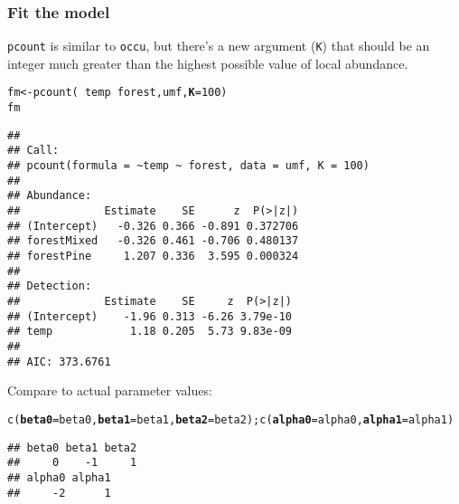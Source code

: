 \documentclass[color=usenames,dvipsnames]{beamer}\usepackage[]{graphicx}\usepackage[]{color}
\makeatletter
\newcommand{\hlnum}[1]{\textcolor[rgb]{0.69,0.494,0}{#1}}%
\newcommand{\hlopt}[1]{\textcolor[rgb]{0,0,0}{#1}}%
\newcommand{\hlstd}[1]{\textcolor[rgb]{0,0,0}{#1}}%
\newcommand{\hlkwb}[1]{\textcolor[rgb]{0,0.341,0.682}{#1}}%
\newcommand{\hlkwc}[1]{\textcolor[rgb]{0,0,0}{\textbf{#1}}}%
\newcommand{\hlkwd}[1]{\textcolor[rgb]{0.004,0.004,0.506}{#1}}%
\newenvironment{kframe}{%
 \def\at@end@of@kframe{}%
 \ifinner\ifhmode%
  \def\at@end@of@kframe{\end{minipage}}%
  \begin{minipage}{\columnwidth}%
 \fi\fi%
 \def\FrameCommand##1{\hskip\@totalleftmargin \hskip-\fboxsep
 \colorbox{shadecolor}{##1}\hskip-\fboxsep
     \hskip-\linewidth \hskip-\@totalleftmargin \hskip\columnwidth}%
 \MakeFramed {\advance\hsize-\width
   \@totalleftmargin\z@ \linewidth\hsize
   \@setminipage}}%
 {\par\unskip\endMakeFramed%
 \at@end@of@kframe}
\newenvironment{knitrout}{}{} %
\newcommand{\inr}[1]{\colorbox{inlinecolor}{\texttt{#1}}}
\makeatother
\begin{document}
\begin{frame}[fragile]
  \frametitle{Fit the model}
  \footnotesize
  \inr{pcount} is similar to \inr{occu}, but there's a new argument
  (\texttt{K}) that should be an integer much 
  greater than the highest possible value of local abundance. 
\begin{knitrout}\tiny
{}\color{fgcolor}\begin{kframe}
\begin{alltt}
\hlstd{fm} \hlkwb{<-} \hlkwd{pcount}\hlstd{(}\hlopt{~}\hlstd{temp} \hlopt{~}\hlstd{forest, umf,} \hlkwc{K}\hlstd{=}\hlnum{100}\hlstd{)}
\hlstd{fm}
\end{alltt}
\begin{verbatim}
## 
## Call:
## pcount(formula = ~temp ~ forest, data = umf, K = 100)
## 
## Abundance:
##             Estimate    SE      z  P(>|z|)
## (Intercept)   -0.326 0.366 -0.891 0.372706
## forestMixed   -0.326 0.461 -0.706 0.480137
## forestPine     1.207 0.336  3.595 0.000324
## 
## Detection:
##             Estimate    SE     z  P(>|z|)
## (Intercept)    -1.96 0.313 -6.26 3.79e-10
## temp            1.18 0.205  5.73 9.83e-09
## 
## AIC: 373.6761
\end{verbatim}
\end{kframe}
\end{knitrout}
\pause
\vfill
Compare to actual parameter values:
\begin{knitrout}\tiny
{}\color{fgcolor}\begin{kframe}
\begin{alltt}
\hlkwd{c}\hlstd{(}\hlkwc{beta0}\hlstd{=beta0,} \hlkwc{beta1}\hlstd{=beta1,} \hlkwc{beta2}\hlstd{=beta2);} \hlkwd{c}\hlstd{(}\hlkwc{alpha0}\hlstd{=alpha0,} \hlkwc{alpha1}\hlstd{=alpha1)}
\end{alltt}
\begin{verbatim}
## beta0 beta1 beta2 
##     0    -1     1
## alpha0 alpha1 
##     -2      1
\end{verbatim}
\end{kframe}
\end{knitrout}
\end{frame}
\end{document}
